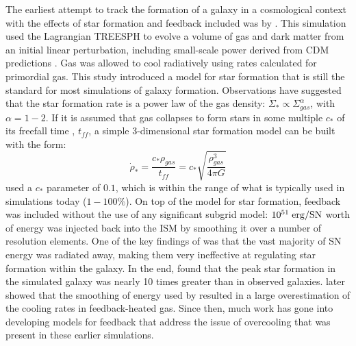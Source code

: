 The earliest attempt to track the formation of a galaxy in a cosmological
context with the effects of star formation and feedback included was by
\citet{Katz1992}.  This simulation used the Lagrangian TREESPH 
\citep{Hernquist1989} to evolve a volume of gas and dark matter from an initial
linear perturbation, including small-scale power derived from CDM predictions
\citep{Zeldovich1970,Peebles1982}.  Gas was allowed to cool radiatively using
rates calculated for primordial gas.  This study introduced a model for star
formation that is still the standard for most simulations of galaxy formation.
Observations \citep{Kennicutt1998} have suggested that the star formation rate
is a power law of the gas density: $\dot\Sigma_*\propto\Sigma_{gas}^\alpha$, with
$\alpha=1-2$.  If it is assumed that gas collapses to form stars in some
multiple $c_*$ of its freefall time \citep{Schmidt1959}, $t_{ff}$, a simple
3-dimensional star formation model can be built with the form:
\begin{equation}
    \dot\rho_* = \frac{c_*\rho_{gas}}{t_{ff}} = c_*\sqrt{\frac{\rho^3_{gas}}{4\pi G}}
\end{equation}
\citet{Katz1992} used a $c_*$ parameter of $0.1$, which is within the range of
what is typically used in simulations today ($1-100\%$).  On top of the model
for star formation, feedback was included without the use of any significant
subgrid model:  $10^{51}\;\rm{erg/SN}$ worth of energy was injected back into
the ISM by smoothing it over a number of resolution elements.  One of the key
findings of \citet{Katz1992} was that the vast majority of SN energy was
radiated away, making them very ineffective at regulating star formation within
the galaxy.  In the end, \citet{Katz1992} found that the peak star formation in
the simulated galaxy was nearly 10 times greater than in observed galaxies.
\citet{Thacker2000} later showed that the smoothing of energy used by
\citet{Katz1992} resulted in a large overestimation of the cooling rates in
feedback-heated gas. Since then, much work has gone into developing models for
feedback that address the issue of overcooling that was present in these
earlier simulations.

